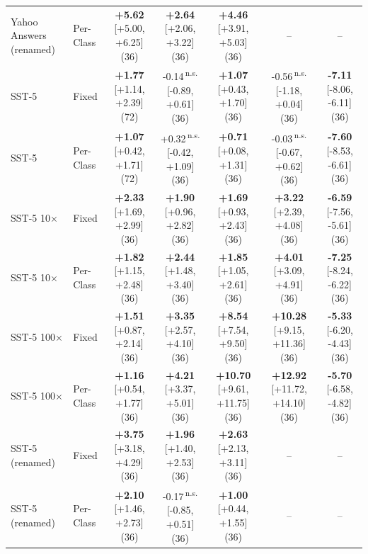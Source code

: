 \begin{tabular}{llccccc}
Yahoo Answers (renamed) & Per-Class & \textbf{+5.62} {\scriptsize [+5.00, +6.25]} (36) & \textbf{+2.64} {\scriptsize [+2.06, +3.22]} (36) & \textbf{+4.46} {\scriptsize [+3.91, +5.03]} (36) & -- & -- \\
SST-5 & Fixed & \textbf{+1.77} {\scriptsize [+1.14, +2.39]} (72) & -0.14\,\textsuperscript{n.s.} {\scriptsize [-0.89, +0.61]} (36) & \textbf{+1.07} {\scriptsize [+0.43, +1.70]} (36) & -0.56\,\textsuperscript{n.s.} {\scriptsize [-1.18, +0.04]} (36) & \textbf{-7.11} {\scriptsize [-8.06, -6.11]} (36) \\
SST-5 & Per-Class & \textbf{+1.07} {\scriptsize [+0.42, +1.71]} (72) & +0.32\,\textsuperscript{n.s.} {\scriptsize [-0.42, +1.09]} (36) & \textbf{+0.71} {\scriptsize [+0.08, +1.31]} (36) & -0.03\,\textsuperscript{n.s.} {\scriptsize [-0.67, +0.62]} (36) & \textbf{-7.60} {\scriptsize [-8.53, -6.61]} (36) \\
SST-5 10$\times$ & Fixed & \textbf{+2.33} {\scriptsize [+1.69, +2.99]} (36) & \textbf{+1.90} {\scriptsize [+0.96, +2.82]} (36) & \textbf{+1.69} {\scriptsize [+0.93, +2.43]} (36) & \textbf{+3.22} {\scriptsize [+2.39, +4.08]} (36) & \textbf{-6.59} {\scriptsize [-7.56, -5.61]} (36) \\
SST-5 10$\times$ & Per-Class & \textbf{+1.82} {\scriptsize [+1.15, +2.48]} (36) & \textbf{+2.44} {\scriptsize [+1.48, +3.40]} (36) & \textbf{+1.85} {\scriptsize [+1.05, +2.61]} (36) & \textbf{+4.01} {\scriptsize [+3.09, +4.91]} (36) & \textbf{-7.25} {\scriptsize [-8.24, -6.22]} (36) \\
SST-5 100$\times$ & Fixed & \textbf{+1.51} {\scriptsize [+0.87, +2.14]} (36) & \textbf{+3.35} {\scriptsize [+2.57, +4.10]} (36) & \textbf{+8.54} {\scriptsize [+7.54, +9.50]} (36) & \textbf{+10.28} {\scriptsize [+9.15, +11.36]} (36) & \textbf{-5.33} {\scriptsize [-6.20, -4.43]} (36) \\
SST-5 100$\times$ & Per-Class & \textbf{+1.16} {\scriptsize [+0.54, +1.77]} (36) & \textbf{+4.21} {\scriptsize [+3.37, +5.01]} (36) & \textbf{+10.70} {\scriptsize [+9.61, +11.75]} (36) & \textbf{+12.92} {\scriptsize [+11.72, +14.10]} (36) & \textbf{-5.70} {\scriptsize [-6.58, -4.82]} (36) \\
SST-5 (renamed) & Fixed & \textbf{+3.75} {\scriptsize [+3.18, +4.29]} (36) & \textbf{+1.96} {\scriptsize [+1.40, +2.53]} (36) & \textbf{+2.63} {\scriptsize [+2.13, +3.11]} (36) & -- & -- \\
SST-5 (renamed) & Per-Class & \textbf{+2.10} {\scriptsize [+1.46, +2.73]} (36) & -0.17\,\textsuperscript{n.s.} {\scriptsize [-0.85, +0.51]} (36) & \textbf{+1.00} {\scriptsize [+0.44, +1.55]} (36) & -- & -- \\

\end{tabular}
